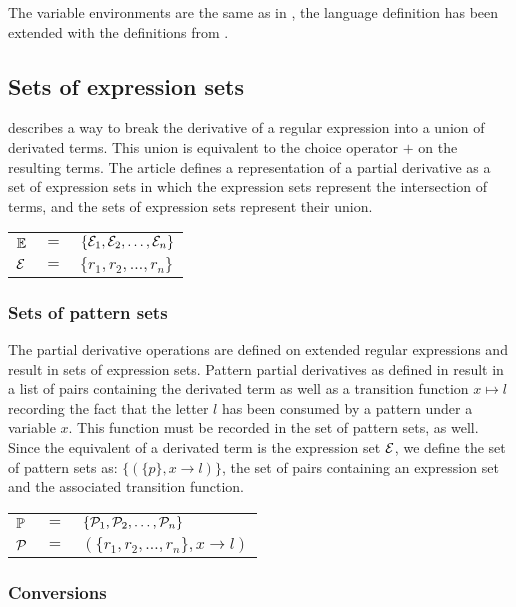 The variable environments are the same as in \cite{pd-pat}, the language
definition has been extended with the definitions from \cite{pd-ere}.


\subsection{Sets of expression sets}

\cite{pd-ere} describes a way to break the derivative of a regular expression
into a union of derivated terms. This union is equivalent to the choice
operator $+$ on the resulting terms. The article defines a representation of a
partial derivative as a set of expression sets in which the expression sets
represent the intersection of terms, and the sets of expression sets represent
their union.

\begin{tabular}{lll}
   $\mathbb{E}$	& $=$ & $\{\mathcal{E}_1, \mathcal{E}_2, \dots, \mathcal{E}_n\}$ \\
   $\mathcal{E}$	& $=$ & $\{r_1, r_2, \dots, r_n\}$ \\
\end{tabular}

\subsubsection{Sets of pattern sets}

The partial derivative operations are defined on extended regular expressions
and result in sets of expression sets. Pattern partial derivatives as defined
in \cite{pd-pat} result in a list of pairs containing the derivated term as
well as a transition function $x \mapsto l$ recording the fact that the letter
$l$ has been consumed by a pattern under a variable $x$. This function must be
recorded in the set of pattern sets, as well. Since the equivalent of a
derivated term is the expression set $\mathcal{E}$, we define the set of
pattern sets as: $\{ (\{ p \}, x \to l) \}$, the set of pairs containing
an expression set and the associated transition function.

\begin{tabular}{lll}
   $\mathbb{P}$	& $=$ & $\{\mathcal{P}_1, \mathcal{P}_2, \dots, \mathcal{P}_n\}$ \\
   $\mathcal{P}$	& $=$ & $(\{r_1, r_2, \dots, r_n\}, x \to l)$ \\
\end{tabular}


\subsubsection{Conversions}


